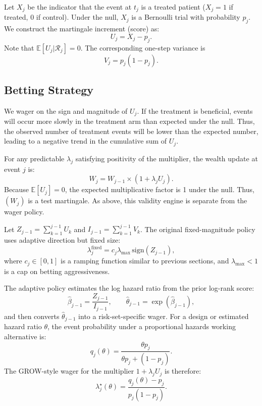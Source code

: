 \documentclass[10pt]{article}
\begin{document}
Let $X_j$ be the indicator that the event at $t_j$ is a treated patient ($X_j = 1$ if treated, $0$ if control). Under the null, $X_j$ is a Bernoulli trial with probability $p_j$. We construct the martingale increment (score) as:
\begin{equation}
U_j = X_j - p_j.
\end{equation}
Note that $\mathbb{E}[U_j | \mathcal{R}_j] = 0$. The corresponding one-step variance is
\begin{equation}
V_j = p_j(1-p_j).
\end{equation}

\subsection{Betting Strategy}

We wager on the sign and magnitude of $U_j$. If the treatment is beneficial, events will occur more slowly in the treatment arm than expected under the null. Thus, the observed number of treatment events will be lower than the expected number, leading to a negative trend in the cumulative sum of $U_j$.

For any predictable $\lambda_j$ satisfying positivity of the multiplier, the wealth update at event $j$ is:
\begin{equation}
W_j = W_{j-1} \times (1 + \lambda_j U_j).
\end{equation}
Because $\mathbb{E}[U_j]=0$, the expected multiplicative factor is 1 under the null. Thus, $(W_j)$ is a test martingale. As above, this validity engine is separate from the wager policy.

Let $Z_{j-1} = \sum_{k=1}^{j-1} U_k$ and $I_{j-1} = \sum_{k=1}^{j-1} V_k$. The original fixed-magnitude policy uses adaptive direction but fixed size:
\begin{equation}
\lambda_j^{\mathrm{fixed}} =
c_j \lambda_{\max}\,\mathrm{sign}(Z_{j-1}),
\end{equation}
where $c_j \in [0,1]$ is a ramping function similar to previous sections, and $\lambda_{\max} < 1$ is a cap on betting aggressiveness.

The adaptive policy estimates the log hazard ratio from the prior log-rank score:
\begin{equation}
\hat{\beta}_{j-1} = \frac{Z_{j-1}}{I_{j-1}}, \qquad \hat{\theta}_{j-1} = \exp(\hat{\beta}_{j-1}),
\end{equation}
and then converts $\hat{\theta}_{j-1}$ into a risk-set-specific wager. For a design or estimated hazard ratio $\theta$, the event probability under a proportional hazards working alternative is:
\begin{equation}
q_j(\theta) =
\frac{\theta p_j}{\theta p_j + (1-p_j)}.
\end{equation}
The GROW-style wager for the multiplier $1+\lambda_j U_j$ is therefore:
\begin{equation}
\lambda_j^\star(\theta) =
\frac{q_j(\theta)-p_j}{p_j(1-p_j)}.
\end{equation}
\end{document}
